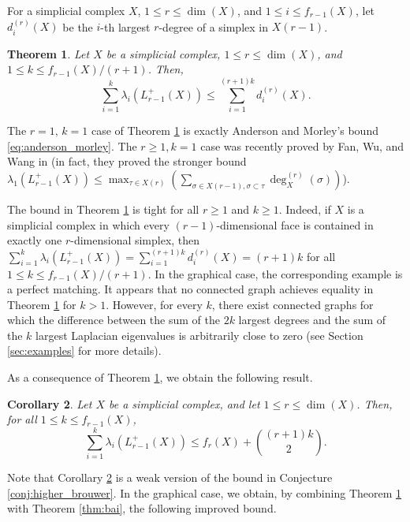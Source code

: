 \documentclass[a4paper,11pt]{article}
\theoremstyle{plain}
\newtheorem{theorem}{\bf Theorem}
\newtheorem{corollary}[theorem]{\bf Corollary}
\theoremstyle{definition}
\numberwithin{theorem}{section}
\numberwithin{equation}{section}
\begin{document}
For a simplicial complex $X$, $1\le r\le \dim(X)$, and $1\le i\le f_{r-1}(X)$, let $d_i^{(r)}(X)$ be the $i$-th largest $r$-degree of a simplex in $X(r-1)$.

\begin{theorem}\label{thm:degree_bound}
    Let $X$ be a simplicial complex, $1\le r\le \dim(X)$, and $1\le k\le f_{r-1}(X)/(r+1)$. Then,
    \[
        \sum_{i=1}^k \lambda_i(L_{r-1}^{+}(X))\le \sum_{i=1}^{(r+1)k} d^{(r)}_i(X).
    \]
\end{theorem}

The $r=1,\, k=1$ case of Theorem \ref{thm:degree_bound} is exactly Anderson and Morley's bound \eqref{eq:anderson_morley}. The $r\ge 1, k=1$ case was recently proved by Fan, Wu, and Wang in \cite[Theorem 3.5]{fan2025largest} (in fact, they proved the stronger bound $\lambda_1(L_{r-1}^{+}(X))\le \max_{\tau\in X(r)} \left(\sum_{\sigma\in X(r-1),\sigma\subset \tau} \deg_X^{(r)}(\sigma)\right)$).

The bound in Theorem \ref{thm:degree_bound} is tight for all $r\ge 1$ and $k\ge 1$. Indeed, if $X$ is a simplicial complex in which every $(r-1)$-dimensional face is contained in exactly one $r$-dimensional simplex, then $\sum_{i=1}^k \lambda_i(L^+_{r-1}(X))=\sum_{i=1}^{(r+1)k}d_i^{(r)}(X)=(r+1)k$ for all $1\le k\le f_{r-1}(X)/(r+1)$. In the graphical case, the corresponding example is a perfect matching.  
It appears that no connected graph achieves equality in Theorem \ref{thm:degree_bound} for $k>1$. However, for every $k$, there exist connected graphs for which the difference between the sum of the $2k$ largest degrees and the sum of the $k$ largest Laplacian eigenvalues is arbitrarily close to zero (see Section \ref{sec:examples} for more details).


As a consequence of Theorem \ref{thm:degree_bound}, we obtain the following result.

\begin{corollary}\label{cor:weak_brouwer_complexes}Let $X$ be a simplicial complex, and let 
$1\le r\le \dim(X)$. Then, for all $1\le k\le f_{r-1}(X)$,
\[
\sum_{i=1}^{k} \lambda_i(L_{r-1}^{+}(X)) \le f_{r}(X) +  \binom{(r+1)k}{2}.
\]
\end{corollary}

Note that Corollary \ref{cor:weak_brouwer_complexes} is a weak version of the bound in Conjecture \ref{conj:higher_brouwer}. In the graphical case, we obtain, by combining Theorem \ref{thm:degree_bound} with Theorem \ref{thm:bai}, the following improved bound.
\end{document}
